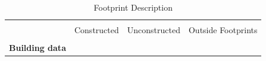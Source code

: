 \documentclass[12pt]{article}
\begin{document}
\vspace{0mm}
\begin{table}[h!]
\centering
\caption{Footprint Description}\label{table:projectdescriptives}
\vspace{0mm}
\begin{tabular}{l*{1}{ccc}}
\toprule
\\[-.5em]
&Constructed &Unconstructed  &Outside Footprints \\[.5em]
\midrule
\\[-.5em]
\textbf{Building data} \\[1em]

% 
% 
\bottomrule
\end{tabular}
\end{table} 

\vspace{0mm}
\begin{table}[h!]
\centering
\caption{Spillover Description}\label{table:projectdescriptives}
\vspace{0mm}
\end{table} 
\end{document}

